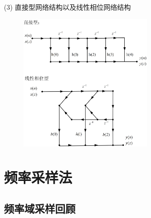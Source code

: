\documentclass[notheorems,compress,mathserif,table]{beamer}
\begin{document}
\begin{frame}[allowframebreaks]
$$     $$
     \newpage
     (3) 直接型网络结构以及线性相位网络结构
     \begin{figure}[h]
          \centering
          \includegraphics[width=0.6\textwidth]{example2.jpg}
      \end{figure}

\end{frame}

\section{频率采样法}
\subsection{频率域采样回顾}
%


%


%
\end{document}

